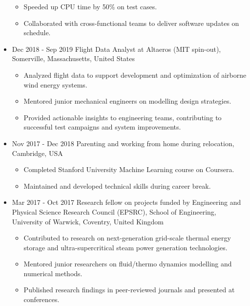 \documentclass[letterpaper]{article}
\begin{document}
\begin{itemize}
\begin{itemize}
   \item Speeded up CPU time by 50\% on test cases.
   \item Collaborated with cross-functional teams to deliver software updates on schedule.
   \end{itemize}
\item Dec 2018 - Sep 2019 \hspace{2pt} Flight Data Analyst at Altaeros (MIT spin-out), Somerville, Massachusetts, United States
  \begin{itemize}
  \item Analyzed flight data to support development and optimization of airborne wind energy systems.
  \item Mentored junior mechanical engineers on modelling design strategies.
  \item Provided actionable insights to engineering teams, contributing to successful test campaigns and system improvements.
  \end{itemize}
	
\item Nov 2017 - Dec 2018 \hspace{2pt} Parenting and working from home during relocation, Cambridge, USA
		\begin{itemize}
		\item Completed Stanford University Machine Learning course on Coursera.
		\item Maintained and developed technical skills during career break.
		\end{itemize}		
\item Mar 2017 - Oct 2017  \hspace{2pt} Research fellow on projects funded by Engineering and Physical Science Research Council (EPSRC), School of Engineering, University of Warwick, Coventry, United Kingdom
		\begin{itemize}
		\item Contributed to research on next-generation grid-scale thermal energy storage and ultra-supercritical steam power generation technologies.
		\item Mentored junior researchers on fluid/thermo dynamics modelling and numerical methods.
    \item Published research findings in peer-reviewed journals and presented at conferences.
		\end{itemize}


\end{itemize}
\end{document}
